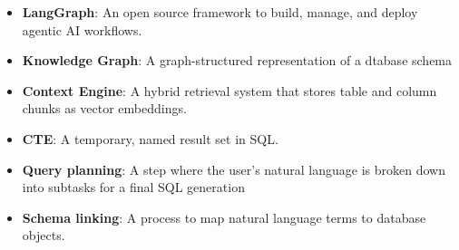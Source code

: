 \begin{itemize}
    \item \textbf{LangGraph}: An open source framework to build, manage, and deploy agentic AI workflows.
    \item \textbf{Knowledge Graph}: A graph-structured representation of a dtabase schema
    \item \textbf{Context Engine}: A hybrid retrieval system that stores table and column chunks as vector embeddings.
    \item \textbf{CTE}: A temporary, named result set in SQL.
    \item \textbf{Query planning}: A step where the user's natural language is broken down into subtasks for a final SQL generation
    \item \textbf{Schema linking}: A process to map natural language terms to database objects.
\end{itemize}

